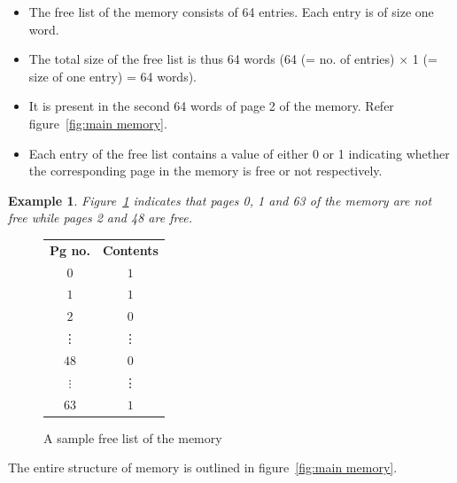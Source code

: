 \documentclass[11pt]{report}
\newtheorem{example}{Example}[section]
\begin{document}
\begin{itemize}
	\item The free list of the memory consists of 64 entries. Each entry is of size one word.
	\item The total size of the free list is thus 64 words (64 (= no. of entries) $\times$ 1 (= size of one entry) = 64 words).
	\item It is present in the second 64 words of page 2 of the memory. Refer figure~\ref{fig:main memory}.
	\item Each entry of the free list contains a value of either 0 or 1 indicating whether the corresponding page in the memory is free or not respectively.
\end{itemize}

\begin{example} 
	Figure~\ref{fig:mem_free_list} indicates that pages 0, 1 and 63 of the memory are not free while pages 2 and 48 are free.
\end{example}

\begin{figure}[htp!] \small
	\centering
	\begin{tabular}{c|c|}
		\textbf{Pg no.} & \textbf{Contents} \\ \cline{2-2}
		$0$ & $1$ \\ \cline{2-2}
		$1$ & $1$ \\ \cline{2-2}
		$2$ & $0$ \\ \cline{2-2}
		\vdots & \vdots \\ \cline{2-2}
		$48$ & $0$ \\ \cline{2-2}
		$\vdots$ & \vdots \\ \cline{2-2}
		$63$ & $1$ \\ \cline{2-2}
	\end{tabular}
	\caption{A sample free list of the memory}
	\label{fig:mem_free_list}
\end{figure}

The entire structure of memory is outlined in figure~\ref{fig:main memory}.
\end{document}
